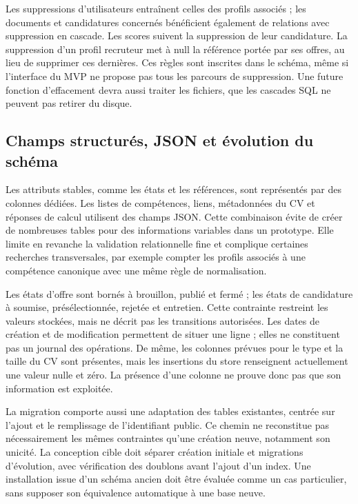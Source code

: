 Les suppressions d'utilisateurs entraînent celles des profils associés ; les documents et candidatures concernés bénéficient également de relations avec suppression en cascade. Les scores suivent la suppression de leur candidature. La suppression d'un profil recruteur met à null la référence portée par ses offres, au lieu de supprimer ces dernières. Ces règles sont inscrites dans le schéma, même si l'interface du MVP ne propose pas tous les parcours de suppression. Une future fonction d'effacement devra aussi traiter les fichiers, que les cascades SQL ne peuvent pas retirer du disque.

\subsection{Champs structurés, JSON et évolution du schéma}

Les attributs stables, comme les états et les références, sont représentés par des colonnes dédiées. Les listes de compétences, liens, métadonnées du CV et réponses de calcul utilisent des champs JSON. Cette combinaison évite de créer de nombreuses tables pour des informations variables dans un prototype. Elle limite en revanche la validation relationnelle fine et complique certaines recherches transversales, par exemple compter les profils associés à une compétence canonique avec une même règle de normalisation.

Les états d'offre sont bornés à brouillon, publié et fermé ; les états de candidature à soumise, présélectionnée, rejetée et entretien. Cette contrainte restreint les valeurs stockées, mais ne décrit pas les transitions autorisées. Les dates de création et de modification permettent de situer une ligne ; elles ne constituent pas un journal des opérations. De même, les colonnes prévues pour le type et la taille du CV sont présentes, mais les insertions du store renseignent actuellement une valeur nulle et zéro. La présence d'une colonne ne prouve donc pas que son information est exploitée.

La migration comporte aussi une adaptation des tables existantes, centrée sur l'ajout et le remplissage de l'identifiant public. Ce chemin ne reconstitue pas nécessairement les mêmes contraintes qu'une création neuve, notamment son unicité. La conception cible doit séparer création initiale et migrations d'évolution, avec vérification des doublons avant l'ajout d'un index. Une installation issue d'un schéma ancien doit être évaluée comme un cas particulier, sans supposer son équivalence automatique à une base neuve.

